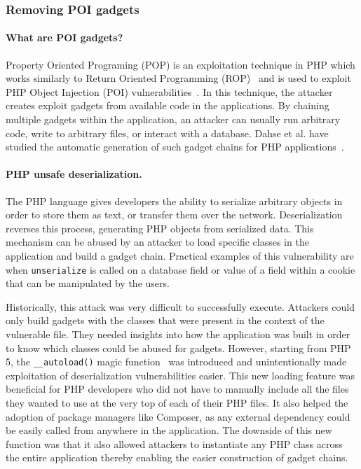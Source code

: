 \subsubsection{Removing POI gadgets}

\paragraph{What are POI gadgets?}
Property Oriented Programing (POP) is an exploitation technique
in PHP which works similarly to Return Oriented Programming
(ROP)~\cite{shacham2007geometry} and is used to exploit PHP Object Injection
(POI) vulnerabilities~\cite{POI}. In this technique, the attacker creates
exploit gadgets from available code in the applications. By chaining
multiple gadgets within the application, an attacker can usually run
arbitrary code, write to arbitrary files, or interact with a database. Dahse
et al. have studied the automatic generation of such gadget chains for PHP
applications~\cite{Dahse:2014:CRA:2660267.2660363}.

\paragraph{PHP unsafe deserialization.}
The PHP language gives developers the ability to serialize arbitrary objects in
order to store them as text, or transfer them over the network. Deserialization
reverses this process, generating PHP objects from serialized data. This
mechanism can be abused by an attacker to load specific classes in the
application and build a gadget chain. Practical examples of this vulnerability
are when \texttt{unserialize} is called on a database field or value of a
field within a cookie that can be manipulated by the users.

Historically, this attack was very difficult to successfully execute. Attackers
could only build gadgets with the classes that were present in the context of
the vulnerable file. They needed insights into how the application was built
in order to know which classes could be abused for gadgets. However, starting
from PHP 5, the \texttt{\_\_autoload()} magic function~\cite{PHPAutoload}
was introduced and unintentionally made exploitation of deserialization
vulnerabilities easier. This new loading feature was beneficial for PHP
developers who did not have to manually include all the files they wanted to
use at the very top of each of their PHP files. It also helped the adoption
of package managers like Composer, as any external dependency could be easily
called from anywhere in the application. The downside of this new function
was that it also allowed attackers to instantiate any PHP class across the
entire application thereby enabling the easier construction of gadget chains.

